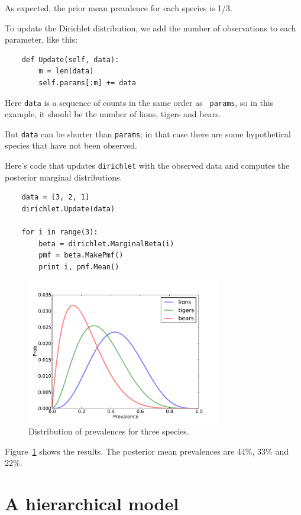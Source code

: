 \documentclass[12pt]{book}
\begin{document}
As expected, the prior mean prevalence for each species is 1/3.

To update the Dirichlet distribution, we add the number of
observations to each parameter, like this:

\begin{verbatim}
    def Update(self, data):
        m = len(data)
        self.params[:m] += data
\end{verbatim}

Here {\tt data} is a sequence of counts in the same order as {\tt
  params}, so in this example, it should be the number of lions,
tigers and bears.

But {\tt data} can be shorter than {\tt params}; in that
case there are some hypothetical species that have not been
observed.

Here's code that updates {\tt dirichlet} with the observed data and
computes the posterior marginal distributions.

\begin{verbatim}
    data = [3, 2, 1]
    dirichlet.Update(data)

    for i in range(3):
        beta = dirichlet.MarginalBeta(i)
        pmf = beta.MakePmf()
        print i, pmf.Mean()
\end{verbatim}

\begin{figure}
\centerline{\includegraphics[height=2.5in]{figs/species1.pdf}}
\caption{Distribution of prevalences for three species.}
\label{fig.species1}
\end{figure}

Figure~\ref{fig.species1} shows the results.  The posterior
mean prevalences are 44\%, 33\% and 22\%.


\section{A hierarchical model}
\end{document}
